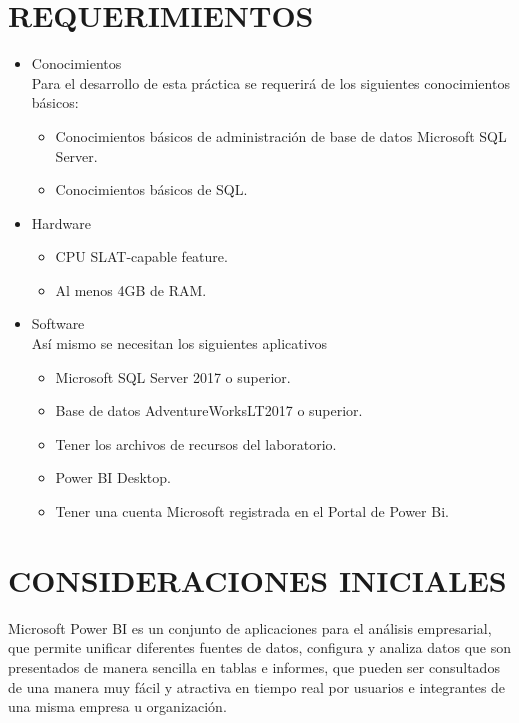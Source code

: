 \documentclass[12pt,letterpaper]{article}
\begin{document}
    \section{REQUERIMIENTOS}
    \begin{itemize}
        \item Conocimientos\\
        Para el desarrollo de esta práctica se requerirá de los siguientes conocimientos básicos:
        \begin{itemize} 
            \item Conocimientos básicos de administración de base de datos Microsoft SQL Server.
            \item Conocimientos básicos de SQL.
        \end{itemize}
        \item Hardware
        \begin{itemize}
            \item CPU SLAT-capable feature.
            \item Al menos 4GB de RAM.
        \end{itemize}
        \item Software\\
        Así mismo se necesitan los siguientes aplicativos
        \begin{itemize}
            \item Microsoft SQL Server 2017 o superior.
            \item Base de datos AdventureWorksLT2017 o superior.
            \item Tener los archivos de recursos del laboratorio.
            \item Power BI Desktop.
            \item Tener una cuenta Microsoft registrada en el Portal de Power Bi.
        \end{itemize}
    \end{itemize}
    
    \section{CONSIDERACIONES INICIALES}
    Microsoft Power BI es un conjunto de aplicaciones para el análisis empresarial, que permite unificar diferentes fuentes de datos, configura y analiza datos que son presentados de manera sencilla en tablas e informes, que pueden ser consultados de una manera muy fácil y atractiva en tiempo real por usuarios e integrantes de una misma empresa u organización.
    
\end{document}
